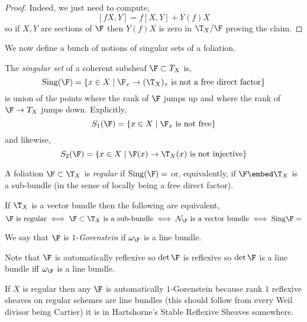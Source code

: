 \documentclass[12pt]{article}
\begin{document}
\begin{proof}
Indeed, we just need to compute,
\[ [f X, Y] = f [X, Y] + Y(f) X \]
so if $X, Y$ are sections of $\F$ then $Y(f) X$ is zero in $\T_X / \F$ proving the claim.
\end{proof}

\renewcommand{\Sing}{\mathrm{Sing}}

We now define a bunch of notions of singular sets of a foliation.

\begin{defn}
The \textit{singular set} of a coherent subsheaf $\F \subset T_X$ is,
\[ \Sing(\F) = \{ x \in X \mid \F_x \to (\T_X)_x \text{ is not a free direct factor} \} \]
is union of the points where the rank of $\F$ jumps up and where the rank of $\F \to T_X$ jumps down. Explicitly, 
\[ S_1(\F) = \{ x \in X \mid \F_x \text{ is not free} \} \]
and likewise,
\[ S_2(\F) = \{ x \in X \mid \F(x) \to \T_X(x) \text{ is not injective} \} \]
\end{defn}

\begin{prop}

\end{prop}

\begin{defn}
A foliation $\F \subset \T_X$ is \textit{regular} if $\Sing{(\F)} = \empty$ or, equivalently, if $\F \embed \T_X$ is a sub-bundle (in the sense of locally being a free direct factor).
\end{defn}

\begin{rmk}
If $\T_X$ is a vector bundle then the following are equivalent,
\[ \F \text{ is regular} \iff \F \subset \T_X \text{ is a sub-bundle} \iff \cN_\F \text{ is a vector bundle} \iff \Sing{\F} = \empty \]
\end{rmk}

\begin{defn}
We say that $\F$ is $1$-\textit{Gorenstein} if $\omega_{\F}$ is a line bundle. 
\end{defn}


\begin{rmk}
Note that $\F$ is automatically reflexive so $\det{\F}$ is reflexive so $\det{\F}$ is a line bundle iff $\omega_\F$ is a line bundle. 
\end{rmk}

\begin{rmk}
If $X$ is regular then any $\F$ is automatically $1$-Gorenstein because rank $1$ reflexive sheaves on regular schemes are line bundles (this should follow from every Weil divisor being Cartier) it is in Hartshorne's Stable Reflexive Sheaves somewhere. 
\end{rmk}
\end{document}
